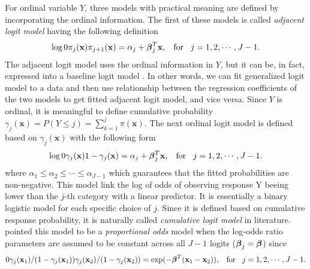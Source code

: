 \documentclass[11pt]{article}
\def\le{\leqslant}
\theoremstyle{plain}
\theoremstyle{definition}
\theoremstyle{remark}
\theoremstyle{definition}
\begin{document}
For ordinal variable $Y$, three models with practical meaning are defined by incorporating the ordinal information. The first of these models is called {\em adjacent logit model} having the following definition
\begin{equation}
\log \frac{\pi_j(\mathbf{x})}{\pi_{j+1}(\mathbf{x})}=\alpha_j +  {\mbox{\boldmath $\beta$}}_j^{T}\mathbf{x}, \hspace{3mm}\mbox{for}\hspace{3mm} j =1, 2, \cdots, J-1. \label{adjacentlogit}
\end{equation}
The adjacent logit model uses the ordinal information in $Y$, but it can be, in fact, expressed into a baseline logit model  \citep{Aggresti-CDA-2002}. In other words, we can fit generalized logit model to a data and then use relationship between the regression coefficients of the two models to get fitted adjacent logit model, and vice versa. Since $Y$ is ordinal, it is meaningful to define cumulative probability $\gamma_j(\mathbf{x})=P(Y \le j)=\sum_{k=1}^j\pi(\mathbf{x})$. The next ordinal logit model is defined based on $\gamma_j(\mathbf{x})$ with the following form
\begin{equation}
\log \frac{\gamma_j(\mathbf{x})}{1-\gamma_j(\mathbf{x})}=\alpha_j +  {\mbox{\boldmath $\beta$}}_j^{T}\mathbf{x}, \hspace{3mm}\mbox{for}\hspace{3mm} j =1, 2, \cdots, J-1. \label{cumulativelogit}
\end{equation}
where $\alpha_1\le \alpha_2 \le \cdots \le \alpha_{J-1}$ which guarantees that the fitted probabilities are non-negative. This model link the log of odds of observing response Y beeing lower than the $j$-th category with a linear predictor. It is essentially a binary logistic model for each specific choice of $j$. Since it is defined based on cumulative response probability, it is naturally called {\em cumulative logit model} in literature. \cite{MCCULLAGH-OrdinalReg-Discussion-1980} pointed this model to be a {\em proportional odds} model when the log-odds ratio parameters are assumed to be constant across all $J-1$ logits (${\mbox{\boldmath $\beta$}}_j={\mbox{\boldmath $\beta$}}$) since
\begin{equation}
\frac{\gamma_j(\mathbf{x}_1)/(1-\gamma_j(\mathbf{x}_1))}{\gamma_{j}(\mathbf{x}_2)/(1-\gamma_{j}(\mathbf{x}_2))}=
\exp(-\mbox{\boldmath $\beta$}^{T}(\mathbf{x}_1-\mathbf{x}_2)), \hspace{3mm}\mbox{for}\hspace{3mm} j =1, 2, \cdots, J-1. \label{PropOdds}
\end{equation}
\end{document}
